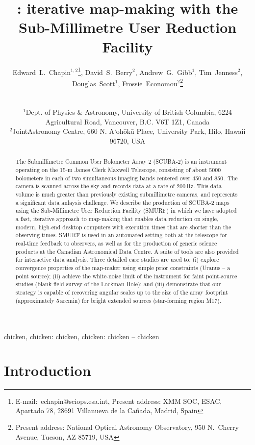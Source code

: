 \documentclass[useAMS,usenatbib,nofootinbib]{mn2e}
\title[\scuba: map-making with SMURF]{\scuba: iterative map-making
with the Sub-Millimetre User Reduction Facility}
\author[Edward~L.~Chapin~et~al.]{
  \parbox[t]{\textwidth}{
    Edward~L.~Chapin$^{1,2}$\thanks{E-mail:~echapin@sciops.esa.int,
      Present address: XMM SOC, ESAC, Apartado 78, 28691 Villanueva de
      la Ca\~nada, Madrid, Spain},
    David~S.~Berry$^{2}$,
    Andrew~G.~Gibb$^{1}$,
    Tim~Jenness$^{2}$,
    Douglas~Scott$^{1}$,
    Frossie~Economou$^2$\thanks{Present address: National Optical
      Astronomy Observatory, 950 N.\ Cherry Avenue, Tucson, AZ 85719, USA}
  }
  \\
  \\
  $^{1}$Dept. of Physics \& Astronomy, University of British Columbia,
  6224 Agricultural Road, Vancouver, B.C. V6T 1Z1, Canada\\
  $^{2}$JointAstronomy Centre, 660 N. A`oh\={o}k\={u} Place, University
  Park, Hilo, Hawaii 96720, USA}
\newcommand{\scuba}{SCUBA-2}
\begin{document}
\label{firstpage}

\maketitle

\begin{abstract}
  The Submillimetre Common User Bolometer Array 2 (\scuba) is an
  instrument operating on the 15-m James Clerk Maxwell Telescope,
  consisting of about 5000 bolometers in each of two simultaneous
  imaging bands centered over 450 and 850\,\micron. The camera is
  scanned across the sky and records data at a rate of 200\,Hz. This
  data volume is much greater than previously existing submillimetre
  cameras, and represents a significant data anlaysis challenge. We
  describe the production of SCUBA-2 maps using the Sub-Millimetre
  User Reduction Facility (SMURF) in which we have adopted a fast,
  iterative approach to map-making that enables data reduction on
  single, modern, high-end desktop computers with execution times that
  are shorter than the observing times.  SMURF is used in an automated
  setting both at the telescope for real-time feedback to observers,
  as well as for the production of generic science products at the
  Canadian Astronomical Data Centre. A suite of tools are also
  provided for interactive data analysis.  Three detailed case studies
  are used to: (i) explore convergence properties of the map-maker
  using simple prior constraints (Uranus -- a point source); (ii)
  achieve the white-noise limit of the instrument for faint
  point-source studies (blank-field survey of the Lockman Hole); and
  (iii) demonstrate that our strategy is capable of recovering angular
  scales up to the size of the array footprint (approximately
  5\,arcmin) for bright extended sources (star-forming region M17).
\end{abstract}


\begin{keywords}
chicken, chicken: chicken, chicken: chicken -- chicken
\end{keywords}

\section{Introduction}
\label{sec:intro}

\end{document}
